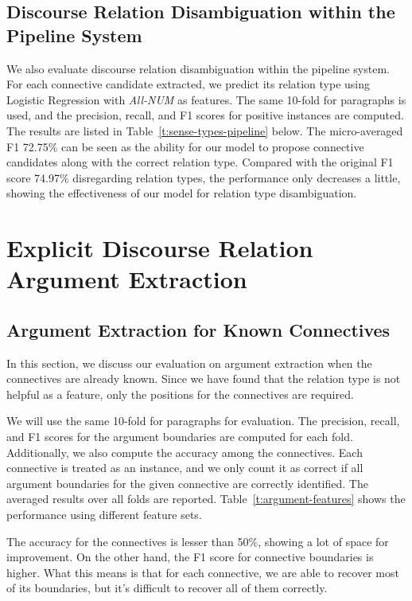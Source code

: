 

\subsection{Discourse Relation Disambiguation within the Pipeline System}

We also evaluate discourse relation disambiguation within the pipeline system.
For each connective candidate extracted, we predict its relation type using
Logistic Regression with \textit{All-NUM} as features.
The same 10-fold for paragraphs is used, and the precision, recall, and F1 scores
for positive instances are computed. The results are listed in
Table~\ref{t:sense-types-pipeline} below. The micro-averaged F1 72.75\% can be seen
as the ability for our model to propose connective candidates along with the correct
relation type. Compared with the original F1 score 74.97\% disregarding relation types,
the performance only decreases a little, showing the effectiveness of our
model for relation type disambiguation.



\section{Explicit Discourse Relation Argument Extraction}

\subsection{Argument Extraction for Known Connectives}

In this section, we discuss our evaluation on argument extraction when the
connectives are already known. Since we have found that the relation type
is not helpful as a feature, only the positions for the connectives are required.

We will use the same 10-fold for paragraphs for evaluation.
The precision, recall, and F1 scores for the argument boundaries are
computed for each fold. Additionally, we also compute the accuracy among the 
connectives. Each connective is treated as an instance, and we only count it
as correct if all argument boundaries for the given connective are correctly identified.
The averaged results over all folds are reported. Table~\ref{t:argument-features} shows
the performance using different feature sets.

The accuracy for the connectives is lesser than 50\%, showing a lot of space for
improvement. On the other hand, the F1 score for connective boundaries is higher.
What this means is that for each connective, we are able to recover most of its
boundaries, but it's difficult to recover all of them correctly.

